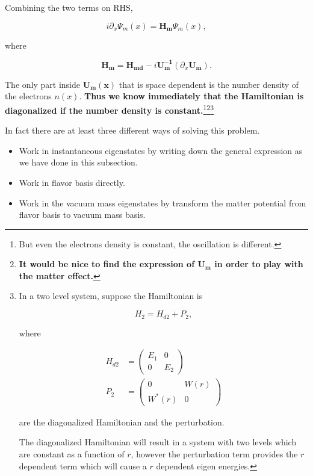 \documentclass{tufte-handout}
\begin{document}
Combining the two terms on RHS,

\begin{equation*}
i\partial_x \Psi_m(x) = \mathbf{H_m} \Psi_m(x),
\end{equation*}

where

\begin{equation*}
\mathbf{H_m} = \mathbf{H_{md}} - i \mathbf{U_m^{-1}} ( \partial_x \mathbf{U_m} ).
\end{equation*}

The only part inside $\mathbf{U_m(x)}$ that is space dependent is the number density of the electrons $n(x)$. {\bf{Thus we know immediately that the Hamiltonian is diagonalized if the number density is constant.}}\footnote{But even the electrons density is constant, the oscillation is different.}\footnote{\bf It would be nice to find the expression of $\mathbf{U_m}$ in order to play with the matter effect.}\footnote{In a two level system, suppose the Hamiltonian is

\begin{equation*}
H_2 = H_{d2} + P_{2},
\end{equation*}

where 

\begin{align*}
H_{d2} & = \begin{pmatrix}
E_1 & 0 \\
0 & E_2
\end{pmatrix} \\
P_{2} & = \begin{pmatrix}
0 & W(r) \\
W^*(r) & 0 
\end{pmatrix}
\end{align*}

are the diagonalized Hamiltonian and the perturbation.

The diagonalized Hamiltonian will result in a system with two levels which are constant as a function of $r$, however the perturbation term provides the $r$ dependent term which will cause a $r$ dependent eigen energies.
}



{\color{red}In fact there are at least three different ways of solving this problem.
\begin{itemize}
\item Work in instantaneous eigenstates by writing down the general expression as we have done in this subsection.
\item Work in flavor basis directly.
\item Work in the vacuum mass eigenstates by transform the matter potential from flavor basis to vacuum mass basis.
\end{itemize}}
\end{document}
